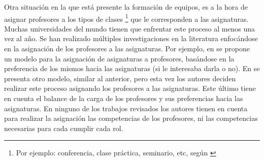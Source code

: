 Otra situación en la que está presente la formación de equipos, es a la hora de asignar profesores a los tipos de clases \footnote{Por ejemplo: conferencia, clase práctica, seminario, etc, según \cite{res2018}} que le corresponden a las asignaturas. Muchas universidades del mundo tienen que enfrentar este proceso al menos una vez al año. Se han realizado múltiples investigaciones en la literatura enfocándose en la asignación de los profesores a las asignaturas. Por ejemplo, en \cite{Bosquez2020} se propone un modelo para la asignación de asignaturas a profesores, basándose en la preferencia de los mismos hacia las asignaturas (si le interesaba darla o no). En \cite{Domenech2014} se presenta otro modelo, similar al anterior, pero esta vez los autores deciden realizar este proceso asignando los profesores a las asignaturas. Este último tiene en cuenta el balance de la carga de los profesores y sus preferencias hacia las asignaturas. En ninguno de los trabajos revisados los autores tienen en cuenta para realizar la asignación las competencias de los profesores, ni las competencias necesarias para cada cumplir cada rol.\\

